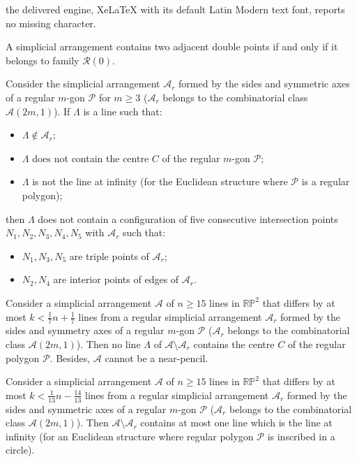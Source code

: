\documentclass[10pt,a4paper]{amsart}
\begin{document}
the delivered engine, XeLaTeX with its default Latin Modern text font, reports no missing character.
\begin{lem}\label{lem:adjaDP}
A simplicial arrangement contains two adjacent double points if and only if it belongs to family $\mathcal{R}(0)$.
\end{lem}

\begin{prop}\label{prop:configuration}
Consider the simplicial arrangement $\mathcal{A}_{r}$ formed by the sides and symmetric axes of a regular $m$-gon $\mathcal{P}$ for $m \geq 3$ ($\mathcal{A}_{r}$ belongs to the combinatorial class $\mathcal{A}(2m,1)$). If $\Lambda$ is a line such that:
\begin{itemize}
    \item $\Lambda \notin \mathcal{A}_{r}$;
    \item $\Lambda$ does not contain the centre $C$ of the regular $m$-gon $\mathcal{P}$;
    \item $\Lambda$ is not the line at infinity (for the Euclidean structure where $\mathcal{P}$ is a regular polygon);
\end{itemize}
then $\Lambda$ does not contain a configuration of five consecutive intersection points $N_{1},N_{2},N_{3},N_{4},N_{5}$ with $\mathcal{A}_{r}$ such that:
\begin{itemize}
    \item $N_{1},N_{3},N_{5}$ are triple points of $\mathcal{A}_{r}$;
    \item $N_{2},N_{4}$ are interior points of edges of $\mathcal{A}_{r}$.
\end{itemize}
\end{prop}

\begin{lem}\label{lem:rigidity}
Consider a simplicial arrangement $\mathcal{A}$ of $n \geq 15$ lines in $\mathbb{RP}^{2}$ that differs by at most $k < \frac{1}{7}n + \frac{1}{7}$ lines from a regular simplicial arrangement $\mathcal{A}_{r}$ formed by the sides and symmetry axes of a regular $m$-gon $\mathcal{P}$ ($\mathcal{A}_{r}$ belongs to the combinatorial class $\mathcal{A}(2m,1)$). Then no line $\Lambda$ of $\mathcal{A} \setminus \mathcal{A}_{r}$ contains the centre $C$ of the regular polygon $\mathcal{P}$. Besides, $\mathcal{A}$ cannot be a near-pencil.
\end{lem}

\begin{lem}\label{lem:rigidity1}
Consider a simplicial arrangement $\mathcal{A}$ of $n \geq 15$ lines in $\mathbb{RP}^{2}$ that differs by at most $k < \frac{1}{13}n - \frac{14}{13}$ lines from a regular simplicial arrangement $\mathcal{A}_{r}$ formed by the sides and symmetric axes of a regular $m$-gon $\mathcal{P}$ ($\mathcal{A}_{r}$ belongs to the combinatorial class $\mathcal{A}(2m,1)$). Then $\mathcal{A} \setminus \mathcal{A}_{r}$ contains at most one line which is the line at infinity (for an Euclidean structure where regular polygon $\mathcal{P}$ is inscribed in a circle).
\end{lem}
\end{document}
